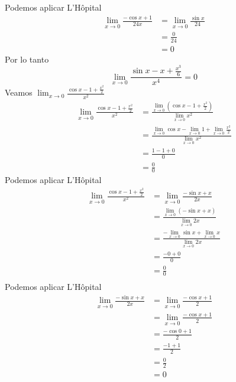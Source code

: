 \documentclass[a4paper]{article}
\begin{document}
Podemos aplicar L'Hôpital
\begin{align*}
    \lim_{x \to 0} \frac{-\cos{x} + 1}{24x} &= \lim_{x \to 0} \frac{\sin{x}}{24} \\
    &= \frac{0}{24} \\
    &= 0
\end{align*}
Por lo tanto 
\[
    \boxed{\boxed{\lim_{x \to 0} \frac{\sin{x} - x + \frac{x^3}{6}}{x^4} = 0}}
\]
Veamos \(\displaystyle{\lim_{x \to 0}} \frac{\cos{x} - 1 + \frac{x^2}{2}}{x^2}\)
\begin{align*}
    \lim_{x \to 0} \frac{\cos{x} - 1 + \frac{x^2}{2}}{x^2} &= \frac{\displaystyle{\lim_{x \to 0}}  \left(\cos{x} - 1 + \frac{x^2}{2}\right)}{\displaystyle{\lim_{x \to 0}} x^2} \\
    &= \frac{\displaystyle{\lim_{x \to 0}}  \cos{x} - \displaystyle{\lim_{x \to 0}} 1 + \displaystyle{\lim_{x \to 0}} \frac{x^2}{2}}{\displaystyle{\lim_{x \to 0}} x^2} \\
    &= \frac{1 - 1 + 0}{0} \\
    &= \frac{0}{0}
\end{align*}
Podemos aplicar L'Hôpital
\begin{align*}
    \lim_{x \to 0} \frac{\cos{x} - 1 + \frac{x^2}{2}}{x^2} &= \lim_{x \to 0} \frac{-\sin{x} + x}{2x} \\
    &= \frac{\displaystyle{\lim_{x \to 0}} \left(-\sin{x} + x\right)}{\displaystyle{\lim_{x \to 0}}2x} \\
    &= \frac{-\displaystyle{\lim_{x \to 0}} \sin{x} + \displaystyle{\lim_{x \to 0}} x}{\displaystyle{\lim_{x \to 0}}2x} \\
    &= \frac{-0 + 0}{0} \\
    &= \frac{0}{0} \\
\end{align*}
Podemos aplicar L'Hôpital
\begin{align*}
    \lim_{x \to 0} \frac{-\sin{x} + x}{2x} &= \lim_{x \to 0} \frac{-\cos{x} + 1}{2} \\
    &= \lim_{x \to 0} \frac{-\cos{x} + 1}{2} \\
    &= \frac{-\cos{0} + 1}{2} \\
    &= \frac{-1 + 1}{2} \\
    &= \frac{0}{2} \\
    &= 0 \\
\end{align*}
\end{document}
